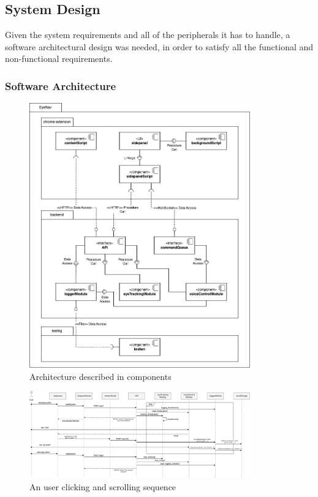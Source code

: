 \subsection{System Design}

Given the system requirements and all of the peripherals it has to handle, a software architectural design was needed, in order to satisfy all the functional and non-functional requirements.

\subsubsection{Software Architecture}


\begin{figure}[ht]
    \centering
    \includegraphics[width=0.85\textwidth]{images/components-diagram.jpg}
    \caption{Architecture described in components}
    \label{fig:components-diagram}
\end{figure}


\begin{figure}[ht]
    \centering
    \includegraphics[width=0.85\textwidth]{images/sequence-diagram.jpg}
    \caption{An user clicking and scrolling sequence}
    \label{fig:sequence-diagram}
\end{figure}


